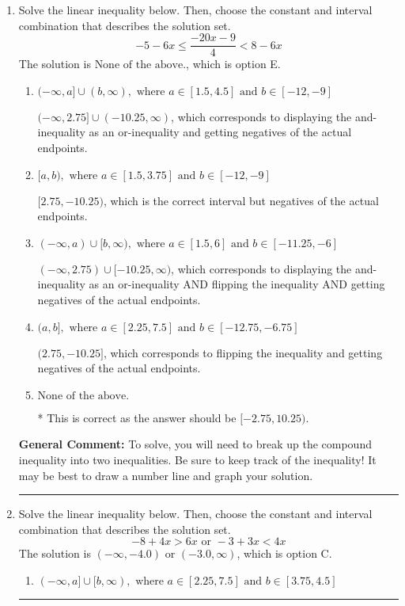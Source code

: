 \documentclass{extbook}[14pt]
\newcommand{\litem}[1]{\item #1

\rule{\textwidth}{0.4pt}}
\begin{document}
\begin{enumerate}
{\textbf{General Comment:} When thinking about this language, it helps to draw a number line and try points.
}
\litem{
Solve the linear inequality below. Then, choose the constant and interval combination that describes the solution set.
\[ -5 - 6 x \leq \frac{-20 x - 9}{4} < 8 - 6 x \]The solution is \( \text{None of the above.} \), which is option E.\begin{enumerate}[label=\Alph*.]
\item \( (-\infty, a] \cup (b, \infty), \text{ where } a \in [1.5, 4.5] \text{ and } b \in [-12, -9] \)

$(-\infty, 2.75] \cup (-10.25, \infty)$, which corresponds to displaying the and-inequality as an or-inequality and getting negatives of the actual endpoints.
\item \( [a, b), \text{ where } a \in [1.5, 3.75] \text{ and } b \in [-12, -9] \)

$[2.75, -10.25)$, which is the correct interval but negatives of the actual endpoints.
\item \( (-\infty, a) \cup [b, \infty), \text{ where } a \in [1.5, 6] \text{ and } b \in [-11.25, -6] \)

$(-\infty, 2.75) \cup [-10.25, \infty)$, which corresponds to displaying the and-inequality as an or-inequality AND flipping the inequality AND getting negatives of the actual endpoints.
\item \( (a, b], \text{ where } a \in [2.25, 7.5] \text{ and } b \in [-12.75, -6.75] \)

$(2.75, -10.25]$, which corresponds to flipping the inequality and getting negatives of the actual endpoints.
\item \( \text{None of the above.} \)

* This is correct as the answer should be $[-2.75, 10.25)$.
\end{enumerate}

\textbf{General Comment:} To solve, you will need to break up the compound inequality into two inequalities. Be sure to keep track of the inequality! It may be best to draw a number line and graph your solution.
}
\litem{
Solve the linear inequality below. Then, choose the constant and interval combination that describes the solution set.
\[ -8 + 4 x > 6 x \text{ or } -3 + 3 x < 4 x \]The solution is \( (-\infty, -4.0) \text{ or } (-3.0, \infty) \), which is option C.\begin{enumerate}[label=\Alph*.]
\item \( (-\infty, a] \cup [b, \infty), \text{ where } a \in [2.25, 7.5] \text{ and } b \in [3.75, 4.5] \)


\end{enumerate}}
\end{enumerate}
\end{document}
